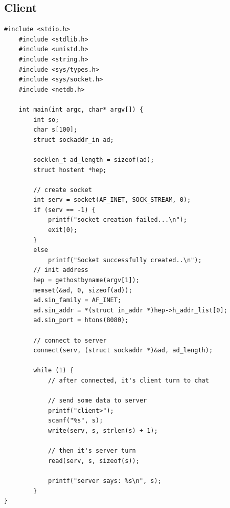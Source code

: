 \documentclass{article}
\begin{document}
\subsection{Client}
\begin{lstlisting}[style=CStyle]
    #include <stdio.h>
    #include <stdlib.h>
    #include <unistd.h>
    #include <string.h>
    #include <sys/types.h>
    #include <sys/socket.h>
    #include <netdb.h>

    int main(int argc, char* argv[]) {
        int so;
        char s[100];
        struct sockaddr_in ad;

        socklen_t ad_length = sizeof(ad);
        struct hostent *hep;

        // create socket
        int serv = socket(AF_INET, SOCK_STREAM, 0);
        if (serv == -1) { 
            printf("socket creation failed...\n"); 
            exit(0); 
        } 
        else
            printf("Socket successfully created..\n"); 
        // init address
        hep = gethostbyname(argv[1]);
        memset(&ad, 0, sizeof(ad));
        ad.sin_family = AF_INET;
        ad.sin_addr = *(struct in_addr *)hep->h_addr_list[0];
        ad.sin_port = htons(8080);

        // connect to server
        connect(serv, (struct sockaddr *)&ad, ad_length);

        while (1) {
            // after connected, it's client turn to chat

            // send some data to server
            printf("client>");
            scanf("%s", s);
            write(serv, s, strlen(s) + 1);

            // then it's server turn
            read(serv, s, sizeof(s));

            printf("server says: %s\n", s);
        }
}
\end{lstlisting}
\end{document}
